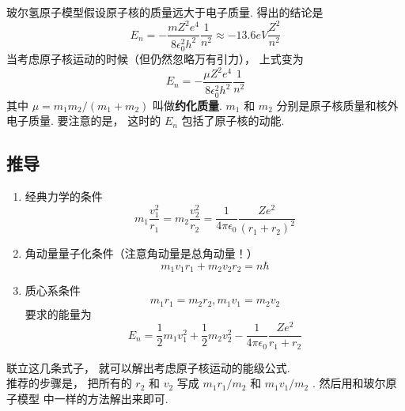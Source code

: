 玻尔氢原子模型假设原子核的质量远大于电子质量. 得出的结论是
\begin{equation}
  {E_n} =  - \frac{{m{Z^2}{e^4}}}{{8\epsilon _0^2{h^2}}}\frac{1}{{{n^2}}} \approx  - 13.6eV\frac{{{Z^2}}}{{{n^2}}}
\end{equation}
当考虑原子核运动的时候（但仍然忽略万有引力）， 上式变为
\begin{equation}
  {E_n} =  - \frac{{\mu {Z^2}{e^4}}}{{8\epsilon _0^2{h^2}}}\frac{1}{{{n^2}}}
\end{equation}
其中 $\mu  = {{{m_1}{m_2}}}/({{{m_1} + {m_2}}})$ 叫做\textbf{约化质量}. ${m_1}$ 和 ${m_2}$ 分别是原子核质量和核外电子质量. 要注意的是， 这时的 ${E_n}$ 包括了原子核的动能.
\subsection{推导}
\begin{enumerate}
  \item 经典力学的条件
  \begin{equation}
    {m_1}\frac{{v_1^2}}{{{r_1}}} = {m_2}\frac{{v_2^2}}{{{r_2}}} = \frac{1}{{4\pi {\epsilon _0}}}\frac{{Z{e^2}}}{{{{\left( {{r_1} + {r_2}} \right)}^2}}}
  \end{equation}
  \item 角动量量子化条件（注意角动量是总角动量！）
  \begin{equation}
    {m_1}{v_1}{r_1} + {m_2}{v_2}{r_2} = n\hbar 
  \end{equation}
  \item 质心系条件
  \begin{equation}
    {m_1}{r_1} = {m_2}{r_2}, {m_1}{v_1} = {m_2}{v_2}
  \end{equation}
  要求的能量为
  \begin{equation}
   {E_n} = \frac{1}{2}{m_1}v_1^2 + \frac{1}{2}{m_2}v_2^2 - \frac{1}{{4\pi {\epsilon _0}}}\frac{{Z{e^2}}}{{{r_1} + {r_2}}}
  \end{equation}
\end{enumerate}
联立这几条式子， 就可以解出考虑原子核运动的能级公式.\\
推荐的步骤是， 把所有的 ${r_2}$ 和 ${v_2}$ 写成 ${{{m_1}{r_1}}}/{{{m_2}}}$ 和 ${{{m_1}{v_1}}}/{{{m_2}}}$ . 然后用和玻尔原子模型%
中一样的方法解出来即可.
